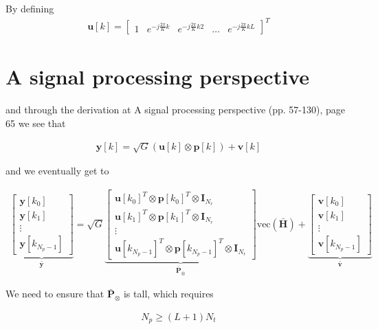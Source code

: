 \documentclass[a4paper, 12pt]{book}
\begin{document}
By defining
\begin{align}
\mathbf{u}[k] = \begin{bmatrix} 1 & e^{-j\frac{2\pi}{K}k} & e^{-j\frac{2\pi}{K}k2} & \dots & e^{-j\frac{2\pi}{K}kL} \end{bmatrix}^T \tag{2.292}
\end{align}

\section{A signal processing perspective}

and through the derivation at A signal processing perspective (pp. 57-130), page 65 we see that

\begin{align}
\mathbf{y}[k] = \sqrt{G}(\mathbf{u}[k] \otimes \mathbf{p}[k]) + \mathbf{v}[k] \tag{2.293}
\end{align}

and we eventually get to

\begin{align}
\underbrace{\begin{bmatrix}
\mathbf{y}[k_0] \\
\mathbf{y}[k_1] \\
\vdots \\
\mathbf{y}[k_{N_p-1}]
\end{bmatrix}}_{\bar{\mathbf{y}}}
= \sqrt{G}
\underbrace{\begin{bmatrix}
\mathbf{u}[k_0]^T \otimes \mathbf{p}[k_0]^T \otimes \mathbf{I}_{N_r} \\
\mathbf{u}[k_1]^T \otimes \mathbf{p}[k_1]^T \otimes \mathbf{I}_{N_r} \\
\vdots \\
\mathbf{u}[k_{N_p-1}]^T \otimes \mathbf{p}[k_{N_p-1}]^T \otimes \mathbf{I}_{N_r}
\end{bmatrix}}_{\bar{\mathbf{P}}_{\otimes}}
\text{vec}(\bar{\boldsymbol{H}}) +
\underbrace{\begin{bmatrix}
\mathbf{v}[k_0] \\
\mathbf{v}[k_1] \\
\vdots \\
\mathbf{v}[k_{N_p-1}]
\end{bmatrix}}_{\bar{\mathbf{v}}} \tag{2.296}
\end{align}

We need to ensure that $\bar{\mathbf{P}}_{\otimes}$ is tall, which requires

\begin{align}
N_p \geq (L+1)N_t \nonumber
\end{align}
\end{document}
